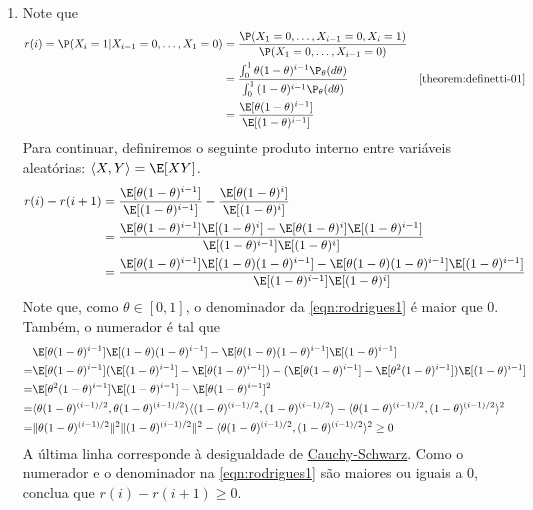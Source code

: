 {\begin{enumerate}[label=(\alph*)]
 \item Note que
 \begin{align*}
  r(i) = \P(X_{i}=1|X_{i-1}=0,\ldots,X_{1}=0)
  &= \frac{\P(X_{1}=0,\ldots,X_{i-1}=0,X_{i}=1)}
  {\P(X_{1}=0,\ldots,X_{i-1}=0)} \\
  &= \frac{\int_{0}^{1}
  {\theta(1-\theta)^{i-1}}\P_{\theta}(d\theta)}
  {\int_{0}^{1}{(1-\theta)^{i-1}}\P_{\theta}(d\theta)}
  & \text{\cref{theorem:definetti-01}} \\
  &= \frac{\E[\theta(1-\theta)^{i-1}]}
  {\E[(1-\theta)^{i-1}]}
 \end{align*}
 Para continuar, 
 definiremos o seguinte produto interno entre
 variáveis aleatórias: $\langle X,Y\rangle = \E[XY]$.
 \begin{align}
  \label{eqn:rodrigues1}
  r(i)-r(i+1)
  &= \frac{\E[\theta(1-\theta)^{i-1}]}
  {\E[(1-\theta)^{i-1}]}-\frac{\E[\theta(1-\theta)^{i}]}
  {\E[(1-\theta)^{i}]} \nonumber \\
  &= \frac{\E[\theta(1-\theta)^{i-1}]\E[(1-\theta)^{i}]
  -\E[\theta(1-\theta)^{i}]\E[(1-\theta)^{i-1}]}
  {\E[(1-\theta)^{i-1}]\E[(1-\theta)^{i}]} \nonumber \\
  &= \frac{\E[\theta(1-\theta)^{i-1}]\E[(1-\theta)(1-\theta)^{i-1}]-\E[\theta(1-\theta)(1-\theta)^{i-1}]\E[(1-\theta)^{i-1}]}{\E[(1-\theta)^{i-1}]\E[(1-\theta)^{i}]}
 \end{align}
 Note que, como $\theta \in [0,1]$,
 o denominador da \cref{eqn:rodrigues1} é
 maior que $0$. Também, o numerador é tal que
 \begin{align*}
  & \E[\theta(1-\theta)^{i-1}]\E[(1-\theta)(1-\theta)^{i-1}]-\E[\theta(1-\theta)(1-\theta)^{i-1}]\E[(1-\theta)^{i-1}] \\
  =& \E[\theta(1-\theta)^{i-1}](\E[(1-\theta)^{i-1}]-\E[\theta(1-\theta)^{i-1}])-(\E[\theta(1-\theta)^{i-1}]-\E[\theta^2(1-\theta)^{i-1}])\E[(1-\theta)^{i-1}] \\
  =& \E[\theta^2(1-\theta)^{i-1}]\E[(1-\theta)^{i-1}] - \E[\theta(1-\theta)^{i-1}]^{2} \\
  =& \langle\theta(1-\theta)^{(i-1)/2},\theta(1-\theta)^{(i-1)/2}\rangle\langle(1-\theta)^{(i-1)/2},(1-\theta)^{(i-1)/2}\rangle - \langle\theta(1-\theta)^{(i-1)/2},(1-\theta)^{(i-1)/2}\rangle^{2}	\\
  =& \|\theta(1-\theta)^{(i-1)/2}\|^{2}\|(1-\theta)^{(i-1)/2}\|^{2} - \langle\theta(1-\theta)^{(i-1)/2},(1-\theta)^{(i-1)/2}\rangle^{2} \geq 0
 \end{align*}
 A última linha corresponde à desigualdade de \href{https://en.wikipedia.org/wiki/Cauchy\%E2\%80\%93Schwarz_inequality}{Cauchy-Schwarz}.
 Como o numerador e o denominador na
 \cref{eqn:rodrigues1} são maiores ou iguais a 0,
 conclua que $r(i)-r(i+1) \geq 0$.
 \end{enumerate}
}{}

